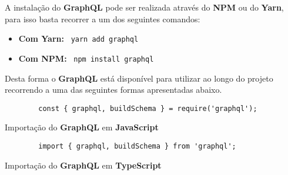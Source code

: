 \label{graphqlAttachments}


A instalação do \textbf{GraphQL} pode ser realizada através do \textbf{NPM} ou do \textbf{Yarn}, para isso basta recorrer a um dos seguintes comandos:

\begin{itemize}
	\item \textbf{Com Yarn:} ~\texttt{yarn add graphql}
	\item \textbf{Com NPM:} ~\texttt{npm install graphql}
\end{itemize}

Desta forma o \textbf{GraphQL} está disponível para utilizar ao longo do projeto recorrendo a uma das seguintes formas apresentadas abaixo.

\begin{longlisting}
	\begin{verbatim}
		const { graphql, buildSchema } = require('graphql');
	\end{verbatim}

	\caption{Importação do \textbf{GraphQL} em \textbf{JavaScript}}
\end{longlisting}

\begin{longlisting}
	\begin{verbatim}
		import { graphql, buildSchema } from 'graphql';
	\end{verbatim}

	\caption{Importação do \textbf{GraphQL} em \textbf{TypeScript}}
\end{longlisting}